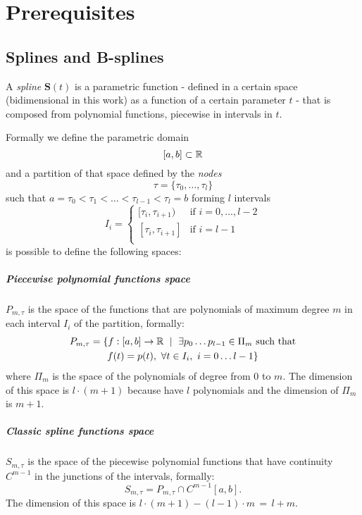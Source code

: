 \documentclass[dissertation.tex]{subfiles}
\begin{document}
\chapter{Prerequisites}
\section{Splines and B-splines}\label{sec:spline}
A \emph{spline} $\mathbf{S}(t)$ is a parametric function - defined in a certain space
(bidimensional in this work) as a
function of a certain parameter $t$ - that is composed from polynomial
functions, piecewise in intervals in $t$.

Formally we define the parametric domain
$$[a,b]\subset\mathbb{R}$$
and a partition of that space defined by the \emph{nodes}
$$\tau = \{\tau_0,\dots,\tau_l\}$$
such that $a=\tau_0<\tau_1<\dots<\tau_{l-1}<\tau_l=b$ forming $l$
intervals
$$
I_i=
\begin{cases}
  [\tau_i,\tau_{i+1}) & \mbox{if } i=0,\dots,l-2\\
    [\tau_i,\tau_{i+1}] & \mbox{if } i=l-1\\
\end{cases}
$$
is possible to define the following spaces:
\paragraph{Piecewise polynomial functions space} $P_{m,\tau}$
is the space of the functions that are polynomials of maximum degree $m$
in each interval $I_i$ of the partition, formally:
\begin{multline*}
  P_{m,\tau}=\{f:[a,b]\rightarrow\mathbb{R}\ \mid\ \exists p_0\dots
  p_{l-1}\in\Pi_m \ \text{such that}\\
  f(t)=p(t),\ \forall t\in I_i,\
  i=0\dots l-1\}
\end{multline*}
where $\Pi_m$ is the space of the polynomials of degree from $0$ to
$m$. The dimension of this space is $l\cdot(m+1)$ because have $l$
polynomials and the dimension of $\Pi_m$ is $m+1$.
\paragraph{Classic spline functions space} $S_{m,\tau}$ is the space of
the piecewise polynomial functions that have continuity $C^{m-1}$ in
the junctions of the intervals, formally:
$$
S_{m,\tau}=P_{m,\tau}\cap C^{m-1}[a,b].
$$
The dimension of this space is $l\cdot(m+1)-(l-1)\cdot m\,=\,l+m$.
\end{document}
